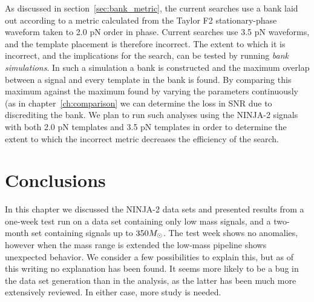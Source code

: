 As discussed in section~\ref{sec:bank_metric}, the current searches
use a bank laid out according to a metric calculated from the Taylor
F2 stationary-phase waveform taken to 2.0 pN order in phase.  Current
searches use 3.5 pN waveforms, and the template placement is therefore
incorrect.  The extent to which it is incorrect, and the implications
for the search, can be tested by running \emph{bank simulations}.  In
such a simulation a bank is constructed and the maximum overlap
between a signal and every template in the bank is found.  By
comparing this maximum against the maximum found by varying the
parameters continuously (as in chapter~\ref{ch:comparison} we can
determine the loss in SNR due to discrediting the bank.  We plan to
run such analyses using the NINJA-2 signals with both 2.0 pN
templates and 3.5 pN templates in order to determine the extent to
which the incorrect metric decreases the efficiency of the search.

\section{Conclusions}

In this chapter we discussed the NINJA-2 data sets and presented
results from a one-week test run on a data set containing only low
mass signals, and a two-month set containing signals up to $350
M_\odot$.  The test week shows no anomalies, however when the mass range
is extended the low-mass pipeline shows unexpected behavior.  We
consider a few possibilities to explain this, but as of this writing
no explanation has been found.  It seems more likely to be a bug in
the data set generation than in the analysis, as the latter has been
much more extensively reviewed.  In either case, more study is needed.


